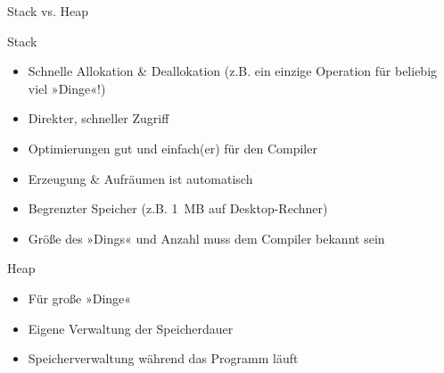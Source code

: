 \begin{frame}[fragile]{Stack vs. Heap}
	\begin{block}{Stack}
		\begin{itemize}
			\item Schnelle Allokation \& Deallokation {\tiny(z.B. ein einzige Operation für beliebig viel »Dinge«!)}
			\item Direkter, schneller Zugriff
			\item Optimierungen gut und einfach(er) für den Compiler
			\item Erzeugung \& Aufräumen ist automatisch
			\item Begrenzter Speicher (z.B. 1~MB auf Desktop-Rechner)
			\item Größe des »Dings« und Anzahl muss dem Compiler bekannt sein
		\end{itemize}
	\end{block}
	
	\begin{block}{Heap}
		\begin{itemize}
			\item Für große »Dinge«
			\item Eigene Verwaltung der Speicherdauer
			\item Speicherverwaltung während das Programm läuft
		\end{itemize}
	\end{block}
\end{frame}

